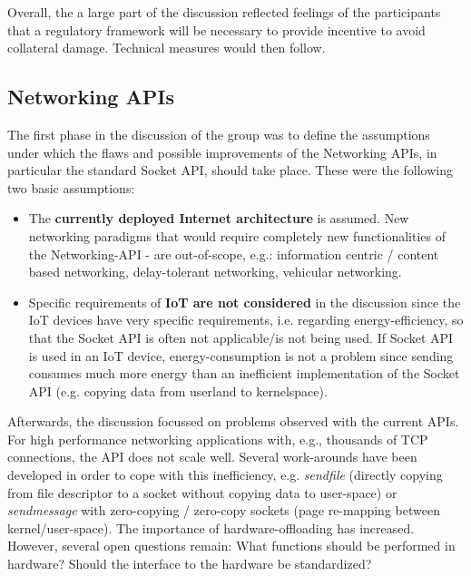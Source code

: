 Overall, the a large part of the discussion reflected feelings of the
participants that a regulatory framework will be necessary to provide
incentive to avoid collateral damage. Technical measures would then follow.

\subsection{Networking APIs}

The first phase in the discussion of the group was to define the assumptions
under which the flaws and possible improvements of the Networking APIs, in
particular the standard Socket API, should take place.  These were the
following two basic assumptions:

\begin{itemize}

\item The \textbf{currently deployed Internet architecture} is assumed.  New
networking paradigms that would require completely new functionalities of the
Networking-API - are out-of-scope, e.g.: information centric / content based
networking, delay-tolerant networking, vehicular networking.

\item Specific requirements of \textbf{IoT are not considered} in the
discussion since the IoT devices have very specific requirements, i.e.
regarding energy-efficiency, so that the Socket API is often not applicable/is
not being used. If Socket API is used in an IoT device, energy-consumption is
not a problem since sending consumes much more energy than an inefficient
implementation of the Socket API (e.g.  copying data from userland to
kernelspace).

\end{itemize}

Afterwards, the discussion focussed on problems observed with the current
APIs. For high performance networking applications with, e.g., thousands of
TCP connections, the API does not scale well. Several work-arounds have been
developed in order to cope with this inefficiency, e.g.  \emph{sendfile}
(directly copying from file descriptor to a socket without copying data to
user-space) or  \emph{sendmessage} with zero-copying / zero-copy sockets (page
re-mapping between kernel/user-space).  The importance of hardware-offloading
has increased. However, several open questions remain: What functions should
be performed in hardware?  Should the interface to the hardware be
standardized?

